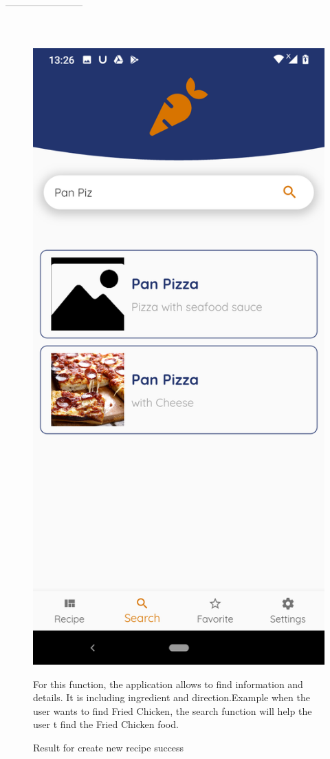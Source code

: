 \documentclass{article}
\begin{document}
          ------------------------\\ \\ \\
        \begin{figure}[h!]
        \centering
        \includegraphics[scale=0.1]{Images/Search.jpg}
        \caption{Result for create new recipe success}
        \label{fig:cookingbook}
        For this function, the application allows to find information and details. It is including ingredient and direction.Example when the user wants to find Fried Chicken, the search function will help the user t find the Fried Chicken food.
        \end{figure}
\end{document}
